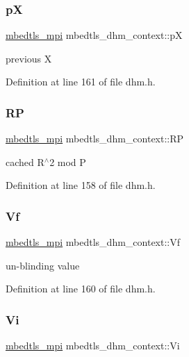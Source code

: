 \subsubsection{\texorpdfstring{pX}{pX}}
{\footnotesize\ttfamily \mbox{\hyperlink{structmbedtls__mpi}{mbedtls\+\_\+mpi}} mbedtls\+\_\+dhm\+\_\+context\+::pX}

previous X 

Definition at line 161 of file dhm.\+h.

\mbox{\label{structmbedtls__dhm__context_ae1801da339af972ee271f947b3fe3734}} 
\subsubsection{\texorpdfstring{RP}{RP}}
{\footnotesize\ttfamily \mbox{\hyperlink{structmbedtls__mpi}{mbedtls\+\_\+mpi}} mbedtls\+\_\+dhm\+\_\+context\+::\+RP}

cached R$^\wedge$2 mod P 

Definition at line 158 of file dhm.\+h.

\mbox{\label{structmbedtls__dhm__context_a1ebf1105240ca26820edb81f41dd6180}} 
\subsubsection{\texorpdfstring{Vf}{Vf}}
{\footnotesize\ttfamily \mbox{\hyperlink{structmbedtls__mpi}{mbedtls\+\_\+mpi}} mbedtls\+\_\+dhm\+\_\+context\+::\+Vf}

un-\/blinding value 

Definition at line 160 of file dhm.\+h.

\mbox{\label{structmbedtls__dhm__context_a21fea3aadf6f05d8aa42c79e55c5d98c}} 
\subsubsection{\texorpdfstring{Vi}{Vi}}
{\footnotesize\ttfamily \mbox{\hyperlink{structmbedtls__mpi}{mbedtls\+\_\+mpi}} mbedtls\+\_\+dhm\+\_\+context\+::\+Vi}

